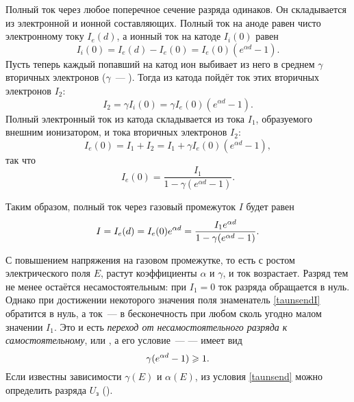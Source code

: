 Полный ток через любое поперечное сечение разряда одинаков.
Он складывается из электронной и ионной составляющих.
Полный ток на аноде равен чисто электронному току $I_e(d)$,
а ионный ток на катоде $I_i(0)$ равен
\begin{equation*}
	I_i(0)=I_e(d)-I_e(0)=I_e(0)(e^{\alpha d}-1).
\end{equation*}
Пусть теперь каждый попавший на катод ион выбивает из него в среднем
$\gamma$ вторичных электронов
($\gamma$~--- ).
Тогда из катода пойдёт ток этих вторичных электронов $I_2$:
\begin{equation*}
	I_2=\gamma I_i(0)=\gamma I_e(0)(e^{\alpha d}-1).
\end{equation*}
Полный электронный ток из катода складывается из тока $I_1$,
образуемого внешним ионизатором, и тока вторичных электронов $I_2$:
\begin{equation*}
	I_e(0)=I_1+I_2=I_1+\gamma I_e(0)(e^{\alpha d}-1),
\end{equation*}
так что
\begin{equation*}
	I_e(0)=\frac{I_1}{1-\gamma(e^{\alpha d}-1)}.
\end{equation*}

Таким образом, полный ток через газовый промежуток $I$ будет равен
\begin{equation}
    \eqmark{taunsendI}
	I=I_e(d)=I_e(0)e^{\alpha d}=\frac{I_1e^{\alpha d}}{1-\gamma(e^{\alpha
d}-1)}.
\end{equation}

С повышением напряжения на газовом промежутке, то есть с ростом электрического
поля $E$, растут коэффициенты $\alpha$ и $\gamma$, и ток возрастает.
Разряд тем не менее остаётся несамостоятельным: при $I_1=0$ ток разряда
обращается в нуль. Однако при достижении некоторого значения поля
знаменатель \eqref{taunsendI} обратится в нуль,
а ток~--- в бесконечность при любом сколь угодно малом значении $I_1$.
Это и есть \emph{переход от несамостоятельного разряда к
самостоятельному}, или , а его
условие~---  --- имеет вид
\begin{equation}
    \eqmark{taunsend}
	\gamma(e^{\alpha d}-1)\ge 1.
\end{equation}
Если известны зависимости $\gamma(E)$ и $\alpha(E)$, из условия \eqref{taunsend}
можно определить  разряда $U_з$
().

